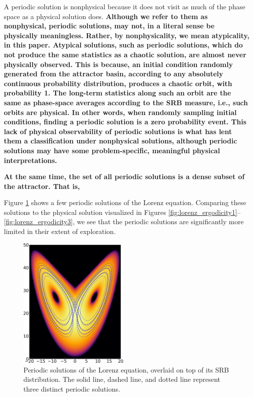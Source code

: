 \documentclass[preprint,12pt]{elsarticle}
\newcommand{\reviewerOne}[1]{{\color{burgundy}\textbf{#1}}}
\begin{document}
A periodic solution is nonphysical because it 
does not visit as much
of the phase space as a physical solution does. \reviewerOne{Although we refer to them as nonphysical, periodic solutions, may not, in a literal sense be physically meaningless. Rather, by nonphysicality, we mean atypicality, in this paper. Atypical solutions, such as periodic solutions, which do not produce the same statistics as a chaotic solution, are almost never physically observed. This is because, an initial condition randomly generated from the attractor basin, according to any absolutely continuous probability distribution, produces a chaotic orbit, with probability 1. The long-term statistics along such an orbit are the same as phase-space averages according to the SRB measure, i.e., such orbits are physical. In other words, when randomly sampling initial conditions, finding a periodic solution is a zero probability event. This lack of physical observability of periodic solutions is what has lent them a classification under nonphysical solutions, although periodic solutions may have some problem-specific, meaningful physical interpretations.}

\reviewerOne{
At the same time, the set of all periodic solutions is a dense subset of the attractor. That is,}

Figure \ref{fig:lorenz_periodic} shows
a few periodic solutions of the Lorenz equation. Comparing these solutions
to the physical solution visualized in Figures \ref{fig:lorenz_ergodicity1}--\ref{fig:lorenz_ergodicity3},
we see that the periodic solutions are significantly more limited in their
extent of exploration.

\begin{figure}\centering
\includegraphics[width=0.48\textwidth]{lorenz_periodic.png}
\caption{Periodic solutions of the Lorenz equation, overlaid on top of
its SRB distribution.  The solid line, dashed line, and dotted line
represent three distinct periodic solutions.}
\label{fig:lorenz_periodic}
\end{figure}
\end{document}
